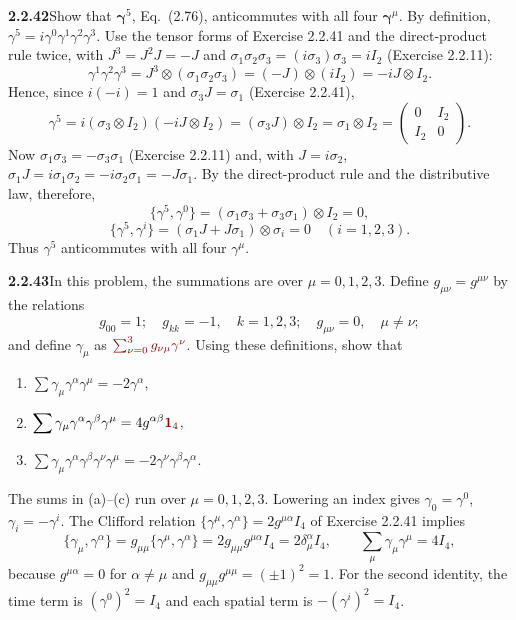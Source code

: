 \par\bigskip
\noindent\textbf{2.2.42}\quad Show that $\boldsymbol{\gamma}^{5}$, Eq.~(2.76),
anticommutes with all four $\boldsymbol{\gamma}^{\mu}$.
\solution
By definition, $\gamma^5=i\gamma^0\gamma^1\gamma^2\gamma^3$.
Use the tensor forms of Exercise 2.2.41 and the direct-product rule twice,
with $J^3=J^2J=-J$ and $\sigma_1\sigma_2\sigma_3=(i\sigma_3)\sigma_3=iI_2$
(Exercise 2.2.11):
\[
\gamma^1\gamma^2\gamma^3
=J^3\otimes(\sigma_1\sigma_2\sigma_3)
=(-J)\otimes(iI_2)=-iJ\otimes I_2.
\]
Hence, since $i(-i)=1$ and $\sigma_3J=\sigma_1$ (Exercise 2.2.41),
\[
\gamma^5=i(\sigma_3\otimes I_2)(-iJ\otimes I_2)
=(\sigma_3J)\otimes I_2=\sigma_1\otimes I_2
=\begin{pmatrix}0&I_2\\I_2&0\end{pmatrix}.
\]
Now $\sigma_1\sigma_3=-\sigma_3\sigma_1$ (Exercise 2.2.11) and, with
$J=i\sigma_2$, $\sigma_1J=i\sigma_1\sigma_2=-i\sigma_2\sigma_1=-J\sigma_1$.
By the direct-product rule and the distributive law, therefore,
\[
\{\gamma^5,\gamma^0\}
=(\sigma_1\sigma_3+\sigma_3\sigma_1)\otimes I_2=0,
\]
\[
\{\gamma^5,\gamma^i\}
=(\sigma_1J+J\sigma_1)\otimes\sigma_i=0\quad(i=1,2,3).
\]
Thus $\gamma^5$ anticommutes with all four $\gamma^\mu$.

\par\bigskip
\noindent\textbf{2.2.43}\quad In this problem, the summations are over
$\mu=0,1,2,3$. Define $g_{\mu\nu}=g^{\mu\nu}$ by the relations
\[
g_{00}=1;\quad g_{kk}=-1,\quad k=1,2,3;\quad g_{\mu\nu}=0,\quad\mu\neq\nu;
\]
and define $\gamma_{\mu}$ as
$\erratum{\sum_{\nu=0}^{3}g_{\nu\mu}\gamma^{\nu}}$. Using these
definitions, show that
\begin{enumerate}
\item[(a)] $\displaystyle\sum\gamma_{\mu}\gamma^{\alpha}\gamma^{\mu}
  =-2\gamma^{\alpha}$,
\item[(b)] $\displaystyle\sum\gamma_{\mu}\gamma^{\alpha}\gamma^{\beta}
  \gamma^{\mu}=4g^{\alpha\beta}\erratum{\mathbf1_4}$,
\item[(c)] $\displaystyle\sum\gamma_{\mu}\gamma^{\alpha}\gamma^{\beta}
  \gamma^{\nu}\gamma^{\mu}=-2\gamma^{\nu}\gamma^{\beta}\gamma^{\alpha}$.
\end{enumerate}
\solution
{}
The sums in (a)--(c) run over $\mu=0,1,2,3$.
Lowering an index gives $\gamma_0=\gamma^0$, $\gamma_i=-\gamma^i$.
The Clifford relation $\{\gamma^\mu,\gamma^\alpha\}=2g^{\mu\alpha}I_4$
of Exercise 2.2.41 implies
\[
\{\gamma_\mu,\gamma^\alpha\}=g_{\mu\mu}\{\gamma^\mu,\gamma^\alpha\}
=2g_{\mu\mu}g^{\mu\alpha}I_4=2\delta_\mu^\alpha I_4,\qquad
\sum_\mu\gamma_\mu\gamma^\mu=4I_4,
\]
because $g^{\mu\alpha}=0$ for $\alpha\ne\mu$ and
$g_{\mu\mu}g^{\mu\mu}=(\pm1)^2=1$.
For the second identity, the time term is $(\gamma^0)^2=I_4$ and each
spatial term is $-(\gamma^i)^2=I_4$.

